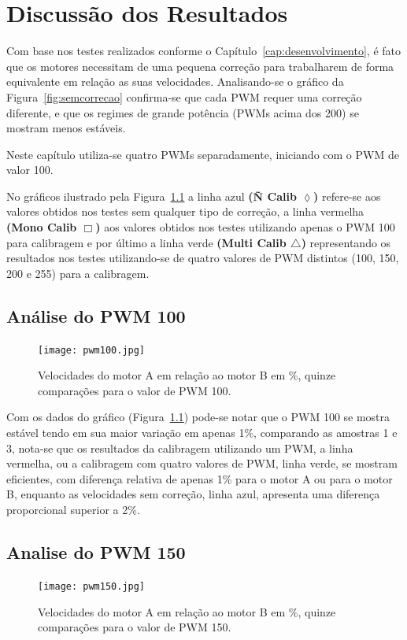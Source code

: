 \documentclass[a4paper,12pt,portuguese]{ufms-cpcx}
\begin{document}
\chapter{Discussão dos Resultados}
Com base nos testes realizados conforme o Capítulo~\ref{cap:desenvolvimento}, é fato que os motores necessitam de uma pequena correção para trabalharem de forma equivalente em relação as suas velocidades. 
Analisando-se o gráfico da Figura~\ref{fig:semcorrecao} confirma-se que cada PWM requer uma correção diferente, e que os regimes de grande potência (PWMs acima dos 200) se mostram menos estáveis. 

Neste capítulo utiliza-se quatro PWMs separadamente, iniciando com o PWM de valor 100.

No gráficos ilustrado pela Figura~\ref{fig:pwm100} a linha azul \textbf{(Ñ Calib $\lozenge$)} refere-se aos valores obtidos nos testes sem qualquer tipo de correção, a linha vermelha \textbf{(Mono Calib $\Box$)} aos valores obtidos nos testes utilizando apenas o PWM 100 para calibragem e por último a linha verde \textbf{(Multi Calib $\triangle$)} representando os resultados nos testes utilizando-se de quatro valores de PWM distintos (100, 150, 200 e 255) para a calibragem.

\section{Análise do PWM 100}\label{pwm100}
\begin{figure}[H]	
	\centering
	\texttt{[image: pwm100.jpg]}
	\caption{Velocidades do motor A em relação ao motor B em \%, quinze comparações para o valor de PWM 100.}
	\label{fig:pwm100}
\end{figure}

Com os dados do gráfico (Figura~\ref{fig:pwm100}) pode-se notar que o PWM 100 se mostra estável tendo em sua maior variação em apenas 1\%, comparando as amostras 1 e 3, nota-se que os resultados da calibragem utilizando um PWM, a linha vermelha, ou a calibragem com quatro valores de PWM, linha verde, se mostram eficientes, com diferença relativa de apenas 1\% para o motor A ou para o motor B, enquanto as velocidades sem correção, linha azul, apresenta uma diferença proporcional superior a 2\%.

\section{Analise do PWM 150}\label{pwm150}
\begin{figure}[H]	
	\centering
	\texttt{[image: pwm150.jpg]}
	\caption{Velocidades do motor A em relação ao motor B em \%, quinze comparações para o valor de PWM 150.}
	\label{fig:pwm150}
\end{figure}
\end{document}
